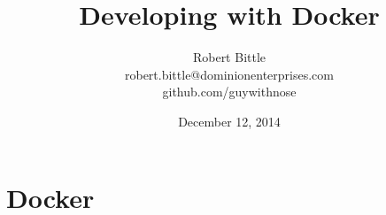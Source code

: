 \documentclass{beamer}
\title[Developing with Docker]{Developing with Docker}
\author{\hspace{12pt}Robert Bittle\hspace{12pt}\\\hspace{12pt}robert.bittle@dominionenterprises.com\hspace{12pt}\\\hspace{12pt}github.com/guywithnose\hspace{12pt}}
\date{December 12, 2014}
\begin{document}
    \begin{frame}
    \titlepage
    \end{frame}

    \section{Docker}
\end{document}
